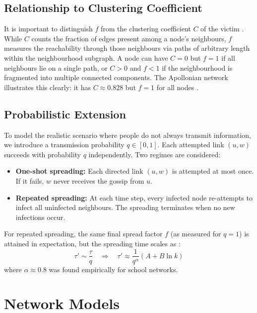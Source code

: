 \documentclass[9pt,a4paper,twocolumn,twoside]{tau-class/tau}
\begin{document}
\subsection{Relationship to Clustering Coefficient}

It is important to distinguish $f$ from the clustering coefficient $C$ of the victim \cite{watts1998}. While $C$ counts the fraction of edges present among a node's neighbours, $f$ measures the reachability through those neighbours via paths of arbitrary length within the neighbourhood subgraph. A node can have $C = 0$ but $f = 1$ if all neighbours lie on a single path, or $C > 0$ and $f < 1$ if the neighbourhood is fragmented into multiple connected components. The Apollonian network illustrates this clearly: it has $C \approx 0.828$ but $f = 1$ for all nodes \cite{lind2007epl}.

\subsection{Probabilistic Extension}\label{sec:prob_model}

To model the realistic scenario where people do not always transmit information, we introduce a transmission probability $q \in [0,1]$. Each attempted link $(u,w)$ succeeds with probability $q$ independently. Two regimes are considered:

\begin{itemize}
    \item \textbf{One-shot spreading:} Each directed link $(u,w)$ is attempted at most once. If it fails, $w$ never receives the gossip from $u$.
    \item \textbf{Repeated spreading:} At each time step, every infected node re-attempts to infect all uninfected neighbours. The spreading terminates when no new infections occur.
\end{itemize}

For repeated spreading, the same final spread factor $f$ (as measured for $q=1$) is attained in expectation, but the spreading time scales as \cite{lind2007epl}:
\begin{equation}\label{eq:tau_q}
    \tau' \sim \frac{\tau}{q} \quad \Rightarrow \quad \tau' \approx \frac{1}{q^\alpha} (A + B \ln k)
\end{equation}
where $\alpha \approx 0.8$ was found empirically for school networks.

\section{Network Models}\label{sec:networks}
\end{document}

